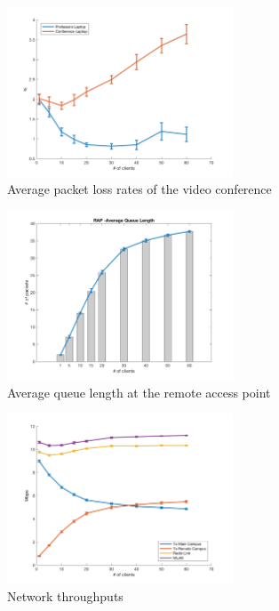 \documentclass[
10pt, %
a4paper, %
oneside, %
headinclude,footinclude, %
BCOR5mm, %
]{scrartcl}
\begin{document}
\begin{figure}[!ht]
  \centering
  \includegraphics[width=0.6\textwidth]{../matlab/images/finalnocctv/Application Packet Loss Rates.png}
  \caption{Average packet loss rates of the video conference} \label{fig:app_pkt_loss}
\end{figure}
\begin{figure}[!ht]
  \centering
  \includegraphics[width=0.6\textwidth]{../matlab/images/finalnocctv/RAP -Average Queue Length.png}
  \caption{Average queue length at the remote access point} \label{fig:rap_queue_len}
\end{figure}
\begin{figure}[!ht]
  \centering
  \includegraphics[width=0.6\textwidth]{../matlab/images/finalnocctv/Network Throughputs.png}
  \caption{Network throughputs} \label{fig:net_throughput}
\end{figure}
\end{document}
